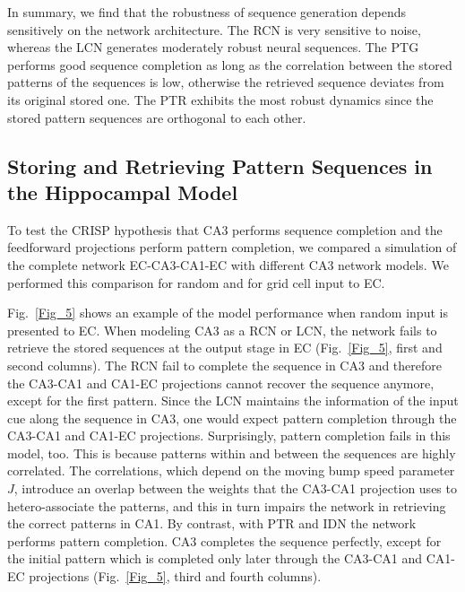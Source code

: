 \documentclass[utf8]{frontiersSCNS} %
\begin{document}
In summary, we find that the robustness of sequence generation depends sensitively on the network architecture. The RCN is very sensitive to noise, whereas the LCN generates moderately robust neural sequences. The PTG performs good sequence completion as long as the correlation between the stored patterns of the sequences is low, otherwise the retrieved sequence deviates from its original stored one. The PTR exhibits the most robust dynamics since the stored pattern sequences are orthogonal to each other.



\subsection{Storing and Retrieving Pattern Sequences in the Hippocampal Model}

To test the CRISP hypothesis that CA3 performs sequence completion and the feedforward projections perform pattern completion, we compared a simulation of the complete network EC-CA3-CA1-EC with different CA3 network models. We performed this comparison for random and for grid cell input to EC. 

Fig.~\ref{Fig_5} shows an example of the model performance when random input is presented to EC. When modeling CA3 as a RCN or LCN, the network fails to retrieve the stored sequences at the output stage in EC (Fig.~\ref{Fig_5}, first and second columns). The RCN fail to complete the sequence in CA3 and therefore the CA3-CA1 and CA1-EC projections cannot recover the sequence anymore, except for the first pattern. Since the LCN maintains the information of the input cue along the sequence in CA3, one would expect pattern completion through the CA3-CA1 and CA1-EC projections. Surprisingly, pattern completion fails in this model, too. This is because patterns within and between the sequences are highly correlated. The correlations, which depend on the moving bump speed parameter $J$, introduce an overlap between the weights that the CA3-CA1 projection uses to hetero-associate the patterns, and this in turn impairs the network in retrieving the correct patterns in CA1. By contrast, with PTR and IDN the network performs pattern completion. CA3 completes the sequence perfectly, except for the initial pattern which is completed only later through the CA3-CA1 and CA1-EC projections (Fig.~\ref{Fig_5}, third and fourth columns).  
\end{document}
